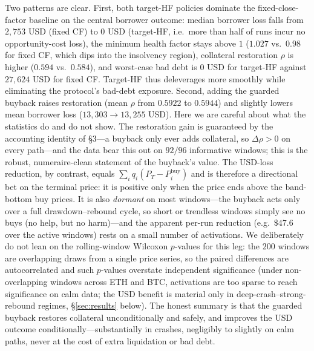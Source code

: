 \documentclass[12pt]{article}
\begin{document}

Two patterns are clear. First, both target-HF policies dominate the fixed-close-factor baseline on the central borrower outcome: median borrower loss falls from $2{,}753$ USD (fixed CF) to $0$ USD (target-HF, i.e.\ more than half of runs incur no opportunity-cost loss), the minimum health factor stays above $1$ ($1.027$ vs.\ $0.98$ for fixed CF, which dips into the insolvency region), collateral restoration $\rho$ is higher ($0.594$ vs.\ $0.584$), and worst-case bad debt is $0$ USD for target-HF against $27{,}624$ USD for fixed CF. Target-HF thus deleverages more smoothly while eliminating the protocol's bad-debt exposure. Second, adding the guarded buyback raises restoration (mean $\rho$ from $0.5922$ to $0.5944$) and slightly lowers mean borrower loss ($13{,}303\to13{,}255$ USD). Here we are careful about what the statistics do and do not show. The restoration gain is guaranteed by the accounting identity of \S3---a buyback only ever adds collateral, so $\Delta\rho>0$ on every path---and the data bear this out on $92/96$ informative windows; this is the robust, numeraire-clean statement of the buyback's value. The USD-loss reduction, by contrast, equals $\sum_i q_i(P_T-P_i^{\text{buy}})$ and is therefore a directional bet on the terminal price: it is positive only when the price ends above the band-bottom buy prices. It is also \emph{dormant} on most windows---the buyback acts only over a full drawdown--rebound cycle, so short or trendless windows simply see no buys (no help, but no harm)---and the apparent per-run reduction (e.g.\ $\$47.6$ over the active windows) rests on a small number of activations. We deliberately do not lean on the rolling-window Wilcoxon $p$-values for this leg: the $200$ windows are overlapping draws from a single price series, so the paired differences are autocorrelated and such $p$-values overstate independent significance (under non-overlapping windows across ETH and BTC, activations are too sparse to reach significance on calm data; the USD benefit is material only in deep-crash--strong-rebound regimes, \S\ref{sec:results} below). The honest summary is that the guarded buyback restores collateral unconditionally and safely, and improves the USD outcome conditionally---substantially in crashes, negligibly to slightly on calm paths, never at the cost of extra liquidation or bad debt.
\end{document}

